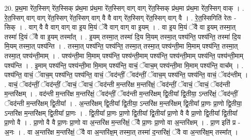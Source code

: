 \documentclass[17pt]{extarticle}
\begin{document}
20. प्र॒थ॒मा रे॑त॒स्सिग् रे॑त॒स्सिक् प्र॑थ॒मा प्र॑थ॒मा रे॑त॒स्सिग् वाग् वाग् रे॑त॒स्सिक् प्र॑थ॒मा प्र॑थ॒मा रे॑त॒स्सिग् वाक् । . रे॒त॒स्सिग् वाग् वाग् रे॑त॒स्सिग् रे॑त॒स्सिग् वाग् वै वै वाग् रे॑त॒स्सिग् रे॑त॒स्सिग् वाग् वै । . रे॒त॒स्सिगिति॑ रेतः - सिक् । . वाग् वै वै वाग् वाग् वा इ॒य मि॒यं ॅवै वाग् वाग् वा इ॒यम् । . वा इ॒य मि॒यं ॅवै वा इ॒यम् तस्मा॒त् तस्मा॑ दि॒यं ॅवै वा इ॒यम् तस्मा᳚त् । . इ॒यम् तस्मा॒त् तस्मा॑ दि॒य मि॒यम् तस्मा॒त् पश्य॑न्ति॒ पश्य॑न्ति॒ तस्मा॑ दि॒य मि॒यम् तस्मा॒त् पश्य॑न्ति । . तस्मा॒त् पश्य॑न्ति॒ पश्य॑न्ति॒ तस्मा॒त् तस्मा॒त् पश्य॑न्ती॒मा मि॒माम् पश्य॑न्ति॒ तस्मा॒त् तस्मा॒त् पश्य॑न्ती॒माम् । . पश्य॑न्ती॒मा मि॒माम् पश्य॑न्ति॒ पश्य॑न्ती॒माम् पश्य॑न्ति॒ पश्य॑न्ती॒माम् पश्य॑न्ति॒ पश्य॑न्ती॒माम् पश्य॑न्ति । . इ॒माम् पश्य॑न्ति॒ पश्य॑न्ती॒मा मि॒माम् पश्य॑न्ति॒ वाचं॒ ॅवाच॒म् पश्य॑न्ती॒मा मि॒माम् पश्य॑न्ति॒ वाच᳚म् । . पश्य॑न्ति॒ वाचं॒ ॅवाच॒म् पश्य॑न्ति॒ पश्य॑न्ति॒ वाचं॒ ॅवद॑न्तीं॒ ॅवद॑न्तीं॒ ॅवाच॒म् पश्य॑न्ति॒ पश्य॑न्ति॒ वाचं॒ ॅवद॑न्तीम् । . वाचं॒ ॅवद॑न्तीं॒ ॅवद॑न्तीं॒ ॅवाचं॒ ॅवाचं॒ ॅवद॑न्ती म॒न्तरि॑क्ष म॒न्तरि॑क्षं॒ ॅवद॑न्तीं॒ ॅवाचं॒ ॅवाचं॒ ॅवद॑न्ती म॒न्तरि॑क्षम् । . वद॑न्ती म॒न्तरि॑क्ष म॒न्तरि॑क्षं॒ ॅवद॑न्तीं॒ ॅवद॑न्ती म॒न्तरि॑क्षम् द्वि॒तीया᳚ द्वि॒तीया॒ ऽन्तरि॑क्षं॒ ॅवद॑न्तीं॒ ॅवद॑न्ती म॒न्तरि॑क्षम् द्वि॒तीया᳚ । . अ॒न्तरि॑क्षम् द्वि॒तीया᳚ द्वि॒तीया॒ ऽन्तरि॑क्ष म॒न्तरि॑क्षम् द्वि॒तीया᳚ प्रा॒णः प्रा॒णो द्वि॒तीया॒ ऽन्तरि॑क्ष म॒न्तरि॑क्षम् द्वि॒तीया᳚ प्रा॒णः । . द्वि॒तीया᳚ प्रा॒णः प्रा॒णो द्वि॒तीया᳚ द्वि॒तीया᳚ प्रा॒णो वै वै प्रा॒णो द्वि॒तीया᳚ द्वि॒तीया᳚ प्रा॒णो वै । . प्रा॒णो वै वै प्रा॒णः प्रा॒णो वा अ॒न्तरि॑क्ष म॒न्तरि॑क्षं॒ ॅवै प्रा॒णः प्रा॒णो वा अ॒न्तरि॑क्षम् । . प्रा॒ण इति॑ प्र - अ॒नः । . वा अ॒न्तरि॑क्ष म॒न्तरि॑क्षं॒ ॅवै वा अ॒न्तरि॑क्ष॒म् तस्मा॒त् तस्मा॑ द॒न्तरि॑क्षं॒ ॅवै वा अ॒न्तरि॑क्ष॒म् तस्मा᳚त् । \newline
\end{document}
